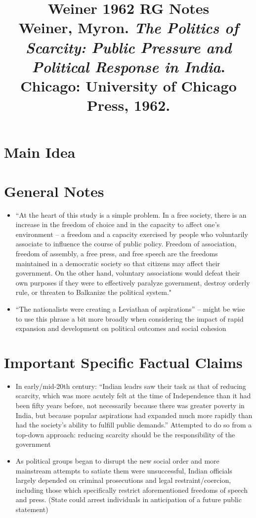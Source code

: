 \documentclass[12pt]{article}
\title{\textbf{Weiner 1962 RG Notes}\\
\large Weiner, Myron. \textit{The Politics of Scarcity: Public Pressure and Political Response in India}.\\
Chicago: University of Chicago Press, 1962.}
\author{}
\date{}
\begin{document}
\maketitle

\section{Main Idea}



\section{General Notes}

\begin{itemize}[leftmargin=*, itemsep=4pt]
    \item ``At the heart of this study is a simple problem. In a free society, there is an increase in the freedom of choice and in the capacity to affect one's environment -- a freedom and a capacity exercised by people who voluntarily associate to influence the course of public policy. Freedom of association, freedom of assembly, a free press, and free speech are the freedoms maintained in a democratic society so that citizens may affect their government. On the other hand, voluntary associations would defeat their own purposes if they were to effectively paralyze government, destroy orderly rule, or threaten to Balkanize the political system."
    \item ``The nationalists were creating a Leviathan of aspirations'' -- might be wise to use this phrase a bit more broadly when considering the impact of rapid expansion and development on political outcomes and social cohesion
\end{itemize}


\section{Important Specific Factual Claims}

\begin{itemize}[leftmargin=*, itemsep=4pt]
    \item In early/mid-20th century: ``Indian leadrs saw their task as that of reducing scarcity, which was more acutely felt at the time of Independence than it had been fifty years before, not necessarily because there was greater poverty in India, but because popular aspirations had expanded much more rapidly than had the society's ability to fulfill public demands.'' Attempted to do so from a top-down approach: reducing scarcity should be the responsibility of the government
    \item As political groups began to disrupt the new social order and more mainstream attempts to satiate them were unsuccessful, Indian officials largely depended on criminal prosecutions and legal restraint/coercion, including those which specifically restrict aforementioned freedoms of speech and press. (State could arrest individuals in anticipation of a future public statement)
\end{itemize}
\end{document}
